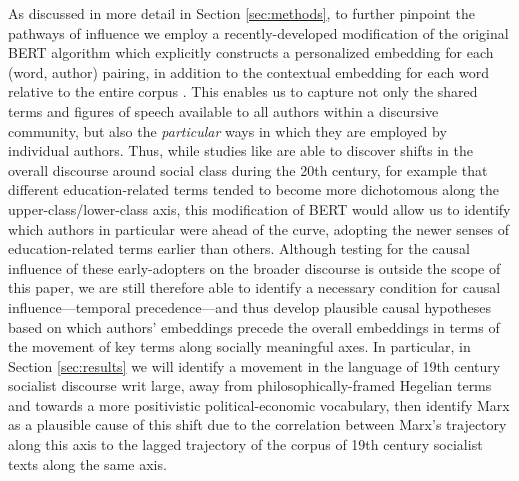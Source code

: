 As discussed in more detail in Section \ref{sec:methods}, to further pinpoint the pathways of influence we employ a recently-developed modification of the original BERT algorithm which explicitly constructs a personalized embedding for each (word, author) pairing, in addition to the contextual embedding for each word relative to the entire corpus \parencite{welch_exploring_2020}. This enables us to capture not only the shared terms and figures of speech available to all authors within a discursive community, but also the \textit{particular} ways in which they are employed by individual authors. Thus, while studies like \cite{kozlowski_geometry_2019} are able to discover shifts in the overall discourse around social class during the 20th century, for example that different education-related terms tended to become more dichotomous along the upper-class/lower-class axis, this modification of BERT would allow us to identify which authors in particular were ahead of the curve, adopting the newer senses of education-related terms earlier than others. Although testing for the causal influence of these early-adopters on the broader discourse is outside the scope of this paper, we are still therefore able to identify a necessary condition for causal influence---temporal precedence---and thus develop plausible causal hypotheses based on which authors' embeddings precede the overall embeddings in terms of the movement of key terms along socially meaningful axes. In particular, in Section \ref{sec:results} we will identify a movement in the language of 19th century socialist discourse writ large, away from philosophically-framed Hegelian terms and towards a more positivistic political-economic vocabulary, then identify Marx as a plausible cause of this shift due to the correlation between Marx's trajectory along this axis to the lagged trajectory of the corpus of 19th century socialist texts along the same axis.
